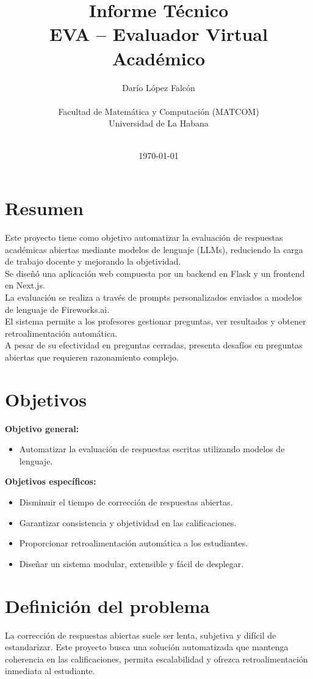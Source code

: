 \documentclass[12pt]{article}
\title{Informe Técnico\\ \large EVA – Evaluador Virtual Académico}
\author{Darío López Falcón\\\\
Facultad de Matemática y Computación (MATCOM)\\
Universidad de La Habana\\\\
}
\date{\today}
\begin{document}
\maketitle

\section*{Resumen}
Este proyecto tiene como objetivo automatizar la evaluación de respuestas académicas abiertas mediante modelos de lenguaje (LLMs), reduciendo la carga de trabajo docente y mejorando la objetividad.\\
\noindent\hspace*{1em}Se diseñó una aplicación web compuesta por un backend en Flask y un frontend en Next.js.\\
\noindent\hspace*{1em}La evaluación se realiza a través de prompts personalizados enviados a modelos de lenguaje de Fireworks.ai.\\
\noindent\hspace*{1em}El sistema permite a los profesores gestionar preguntas, ver resultados y obtener retroalimentación automática.\\
\noindent\hspace*{1em}A pesar de su efectividad en preguntas cerradas, presenta desafíos en preguntas abiertas que requieren razonamiento complejo.

\section*{Objetivos}
\textbf{Objetivo general:}
\begin{itemize}
  \item Automatizar la evaluación de respuestas escritas utilizando modelos de lenguaje.
\end{itemize}

\textbf{Objetivos específicos:}
\begin{itemize}
  \item Disminuir el tiempo de corrección de respuestas abiertas.
  \item Garantizar consistencia y objetividad en las calificaciones.
  \item Proporcionar retroalimentación automática a los estudiantes.
  \item Diseñar un sistema modular, extensible y fácil de desplegar.
\end{itemize}

\section{Definición del problema}
La corrección de respuestas abiertas suele ser lenta, subjetiva y difícil de estandarizar. Este proyecto busca una solución automatizada que mantenga coherencia en las calificaciones, permita escalabilidad y ofrezca retroalimentación inmediata al estudiante.
\end{document}
